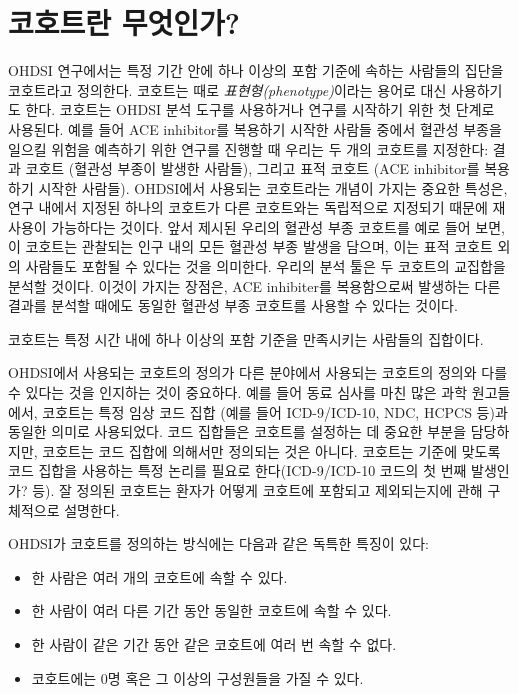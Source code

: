 \documentclass[11pt]{book}
\providecommand{\tightlist}{%
  \setlength{\itemsep}{0pt}\setlength{\parskip}{0pt}}
\theoremstyle{definition}
\theoremstyle{definition}
\theoremstyle{definition}
\theoremstyle{remark}
\let\BeginKnitrBlock\begin \let\EndKnitrBlock\end
\begin{document}
\section{코호트란 무엇인가?}\label{-}

OHDSI 연구에서는 특정 기간 안에 하나 이상의 포함 기준에 속하는 사람들의
집단을 코호트라고 정의한다. 코호트는 때로 \emph{표현형(phenotype)}이라는
용어로 대신 사용하기도 한다. 코호트는 OHDSI 분석 도구를 사용하거나
연구를 시작하기 위한 첫 단계로 사용된다. 예를 들어 ACE inhibitor를
복용하기 시작한 사람들 중에서 혈관성 부종을 일으킬 위험을 예측하기 위한
연구를 진행할 때 우리는 두 개의 코호트를 지정한다: 결과 코호트 (혈관성
부종이 발생한 사람들), 그리고 표적 코호트 (ACE inhibitor를 복용하기
시작한 사람들). OHDSI에서 사용되는 코호트라는 개념이 가지는 중요한
특성은, 연구 내에서 지정된 하나의 코호트가 다른 코호트와는 독립적으로
지정되기 때문에 재사용이 가능하다는 것이다. 앞서 제시된 우리의 혈관성
부종 코호트를 예로 들어 보면, 이 코호트는 관찰되는 인구 내의 모든 혈관성
부종 발생을 담으며, 이는 표적 코호트 외의 사람들도 포함될 수 있다는 것을
의미한다. 우리의 분석 툴은 두 코호트의 교집합을 분석할 것이다. 이것이
가지는 장점은, ACE inhibiter를 복용함으로써 발생하는 다른 결과를 분석할
때에도 동일한 혈관성 부종 코호트를 사용할 수 있다는 것이다.

\BeginKnitrBlock{rmdimportant}
코호트는 특정 시간 내에 하나 이상의 포함 기준을 만족시키는 사람들의
집합이다.
\EndKnitrBlock{rmdimportant}

  OHDSI에서 사용되는 코호트의
정의가 다른 분야에서 사용되는 코호트의 정의와 다를 수 있다는 것을
인지하는 것이 중요하다. 예를 들어 동료 심사를 마친 많은 과학 원고들에서,
코호트는 특정 임상 코드 집합 (예를 들어 ICD-9/ICD-10, NDC, HCPCS 등)과
동일한 의미로 사용되었다. 코드 집합들은 코호트를 설정하는 데 중요한
부분을 담당하지만, 코호트는 코드 집합에 의해서만 정의되는 것은 아니다.
코호트는 기준에 맞도록 코드 집합을 사용하는 특정 논리를 필요로
한다(ICD-9/ICD-10 코드의 첫 번째 발생인가? 등). 잘 정의된 코호트는
환자가 어떻게 코호트에 포함되고 제외되는지에 관해 구체적으로 설명한다.

 OHDSI가 코호트를 정의하는 방식에는 다음과 같은 독특한
특징이 있다:

\begin{itemize}
\tightlist
\item
  한 사람은 여러 개의 코호트에 속할 수 있다.
\item
  한 사람이 여러 다른 기간 동안 동일한 코호트에 속할 수 있다.
\item
  한 사람이 같은 기간 동안 같은 코호트에 여러 번 속할 수 없다.
\item
  코호트에는 0명 혹은 그 이상의 구성원들을 가질 수 있다.
\end{itemize}
\end{document}
